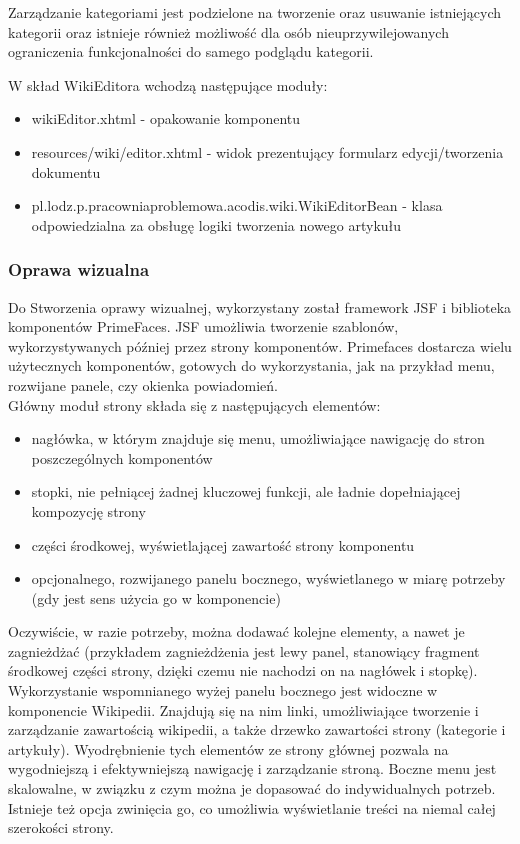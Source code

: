 \documentclass{classrep}
\begin{document}
Zarządzanie kategoriami jest podzielone na tworzenie oraz usuwanie istniejących kategorii oraz istnieje również możliwość dla osób nieuprzywilejowanych ograniczenia funkcjonalności do samego podglądu kategorii.

W skład WikiEditora wchodzą następujące moduły:
\begin{itemize}
\item wikiEditor.xhtml - opakowanie komponentu
\item resources/wiki/editor.xhtml - widok prezentujący formularz edycji/tworzenia dokumentu
\item pl.lodz.p.pracowniaproblemowa.acodis.wiki.WikiEditorBean - klasa odpowiedzialna za obsługę logiki tworzenia nowego artykułu
\end{itemize}

\subsubsection{Oprawa wizualna}
Do Stworzenia oprawy wizualnej, wykorzystany został framework JSF i biblioteka komponentów PrimeFaces. JSF umożliwia tworzenie szablonów, wykorzystywanych później przez strony komponentów. Primefaces dostarcza wielu użytecznych komponentów, gotowych do wykorzystania, jak na przykład menu, rozwijane panele, czy okienka powiadomień.\\
Główny moduł strony składa się z następujących elementów:
\begin{itemize}
  \item nagłówka, w którym znajduje się menu, umożliwiające nawigację do stron poszczególnych komponentów 
  \item stopki, nie pełniącej żadnej kluczowej funkcji, ale ładnie dopełniającej kompozycję strony
  \item części środkowej, wyświetlającej zawartość strony komponentu
  \item opcjonalnego, rozwijanego panelu bocznego, wyświetlanego w miarę potrzeby (gdy jest sens użycia go w komponencie)
\end{itemize}
Oczywiście, w razie potrzeby, można dodawać kolejne elementy, a nawet je zagnieżdżać (przykładem zagnieżdżenia jest lewy panel, stanowiący fragment środkowej części strony, dzięki czemu nie nachodzi on na nagłówek i stopkę).\\
Wykorzystanie wspomnianego wyżej panelu bocznego jest widoczne w komponencie Wikipedii. Znajdują się na nim linki, umożliwiające tworzenie i zarządzanie zawartością wikipedii, a także drzewko zawartości strony (kategorie i artykuły). Wyodrębnienie tych elementów ze strony głównej pozwala na wygodniejszą i efektywniejszą nawigację i zarządzanie stroną. Boczne menu jest skalowalne, w związku z czym można je dopasować do indywidualnych potrzeb. Istnieje też opcja zwinięcia go, co umożliwia wyświetlanie treści na niemal całej szerokości strony.\\
\end{document}
